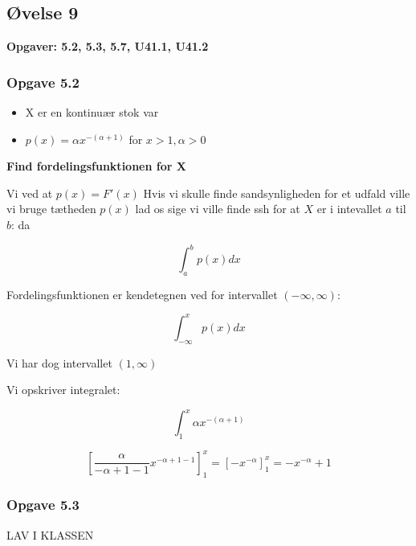 \horizline

\subsection{Øvelse 9}

\textbf{Opgaver: 5.2, 5.3, 5.7, U41.1, U41.2 }

\subsubsection{Opgave 5.2}

\begin{itemize}
    \item X er en kontinuær stok var
    \item $p(x) = \alpha x^{- (\alpha + 1)}$ for $x>1,\alpha > 0 $
\end{itemize}

\textbf{Find fordelingsfunktionen for X}

Vi ved at $p(x) = F'(x)$ Hvis vi skulle finde sandsynligheden for et udfald ville vi bruge tætheden $p(x)$ lad os sige vi ville finde ssh for at $X$ er i intevallet $a$ til $b$: da

\begin{equation}
    \int_{a}^{b}p(x) dx
\end{equation}

Fordelingsfunktionen er kendetegnen ved for intervallet $(-\infty, \infty)$:

\begin{equation}
    \int_{-\infty}^{x} p(x) dx
\end{equation}

Vi har dog intervallet $(1, \infty)$

Vi opskriver integralet:

\begin{equation}
    \int_{1}^{x} \alpha x^{-(\alpha + 1)}    
\end{equation}

\begin{equation}
   \left[\frac{\alpha}{-\alpha + 1 - 1}  x^{-\alpha + 1 - 1} \right]_{1}^{x} = [-x^{-\alpha}]_{1}^{x}=  - x^{-\alpha}  +1
\end{equation}

\subsubsection{Opgave 5.3}

LAV I KLASSEN

